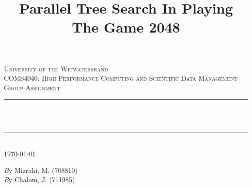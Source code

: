 \documentclass[a4paper]{report}
\title{Parallel Tree Search In Playing The Game 2048}
\author{}
\begin{document}
\begin{titlepage}

\newcommand{\HRule}{\rule{\linewidth}{0.5mm}} %

\center %
 

\textsc{\LARGE University of the Witwatersrand}\\[1.5cm] %
\textsc{\Large COMS4040: High Performance Computing and Scientific Data Management Group Assignment}\\[0.5cm] %

\makeatletter
\HRule \\[0.4cm]
{ \huge \bfseries \@title}\\[0.4cm] %
\HRule \\[1.5cm]
 
{\large \today}\\[2cm] %

\begin{minipage}{1\textwidth}
  \Large \emph By Mizrahi, M. (708810)\\
  \Large \emph By Chalom, J. (711985)\\
\end{minipage}






\end{titlepage}
\end{document}
